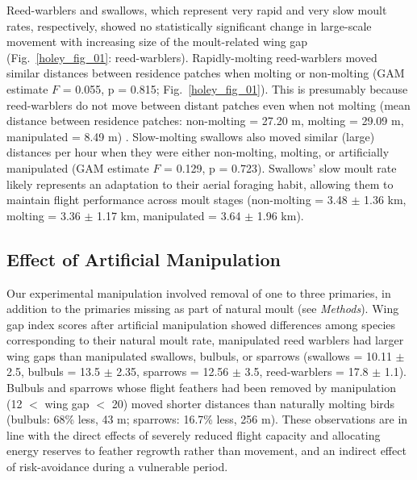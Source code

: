 Reed-warblers and swallows, which represent very rapid and very slow moult rates, respectively, showed no statistically significant change in large-scale movement with increasing size of the moult-related wing gap (Fig.~\ref{holey_fig_01}: reed-warblers).
Rapidly-molting reed-warblers moved similar distances between residence patches when molting or non-molting (GAM estimate $F$ = 0.055, p = 0.815; Fig.~\ref{holey_fig_01}).
This is presumably because reed-warblers 
do not move between distant patches even when not molting (mean distance between residence patches: non-molting = 27.20 m, molting = 29.09 m, manipulated = 8.49 m) \citep{kiat2016}.
Slow-molting swallows also moved similar (large) distances per hour when they were either non-molting, molting, or artificially manipulated (GAM estimate $F$ = 0.129, p = 0.723).
Swallows' slow moult rate likely represents an adaptation to their aerial foraging habit, allowing them to maintain flight performance across moult stages (non-molting = 3.48 $\pm$ 1.36 km, molting = 3.36 $\pm$ 1.17 km, manipulated = 3.64 $\pm$ 1.96 km).

\subsection*{Effect of Artificial Manipulation}

Our experimental manipulation involved removal of one to three primaries, in addition to the primaries missing as part of natural moult (see \emph{Methods}).
Wing gap index scores after artificial manipulation showed differences among species corresponding to their natural moult rate, manipulated reed warblers had larger wing gaps than manipulated swallows, bulbuls, or sparrows {(swallows = 10.11 $\pm$ 2.5, bulbuls = 13.5 $\pm$ 2.35, sparrows = 12.56 $\pm$ 3.5, reed-warblers = 17.8 $\pm$ 1.1).}
Bulbuls and sparrows whose flight feathers had been removed by manipulation (12 $<$ wing gap $<$ 20) moved shorter distances than naturally molting birds {(bulbuls: 68\% less, 43 m; sparrows: 16.7\% less, 256 m)}.
These observations are in line with the direct effects of severely reduced flight capacity and allocating energy reserves to feather regrowth rather than movement, and an indirect effect of risk-avoidance during a vulnerable period.

